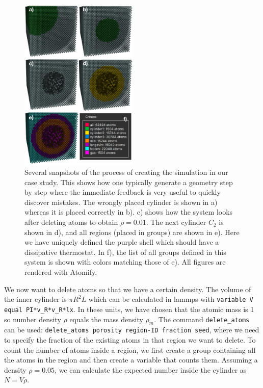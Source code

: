 \documentclass[aps,pre,twocolumn,letterpaper,floatfix,nofootinbib]{revtex4}
\newcommand{\code}[1]{\colorbox{light-gray}{\color{RawSienna}\texttt{#1}}}
\begin{document}
\begin{figure}
	\centering
	\includegraphics[width=0.5\textwidth]{figures/initial_configuration.pdf}
	\caption{
		Several snapshots of the process of creating the simulation in our case study.
		This shows how one typically generate a geometry step by step where the immediate
		feedback is very useful to quickly discover mistakes.
		The wrongly placed cylinder is shown in a) whereas it is placed correctly in b).
		c) shows how the system looks after deleting atoms to obtain $\rho = 0.01$. The next cylinder $C_2$ is shown in d),
		and all regions (placed in groups) are shown in e). Here we have uniquely defined the purple shell which should have a dissipative thermostat.
		In f), the list of all groups defined in this system is shown with colors matching those of e). All figures are rendered with Atomify.
    }
	\label{fig:initial_configuration}
\end{figure}
We now want to delete atoms so that we have a certain density. The volume of the inner cylinder is $\pi R^2 L$ which can be calculated in lammps with \code{variable V equal PI*v\_R*v\_R*lx}.
In these units, we have chosen that the atomic mass is 1 so number density $\rho$ equals the mass density $\rho_m$.
The command \code{delete\_atoms} can be used: \code{delete\_atoms porosity region-ID fraction seed}, where we need to specify the fraction of the existing atoms in that region we want to delete.
To count the number of atoms inside a region, we first create a group containing all the atoms in the region and then create a variable that counts them.
Assuming a density $\rho = 0.05$, we can calculate the expected number inside the cylinder as $N = V\rho$.
\end{document}
